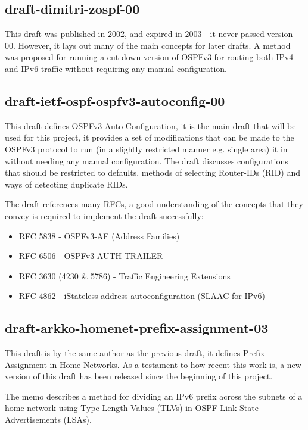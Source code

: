 \documentclass[12pt]{report}
\begin{document}
\subsection{draft-dimitri-zospf-00}
This draft was published in 2002, and expired in 2003 - it never passed version
00.  However, it lays out many of the main concepts for later drafts. A method
was proposed for running a cut down version of OSPFv3 for routing both IPv4 and
IPv6 traffic without requiring any manual configuration. 

\subsection{draft-ietf-ospf-ospfv3-autoconfig-00} 
This draft defines OSPFv3 Auto-Configuration, it is the main draft that will be
used for this project, it provides a set of modifications that can be made to
the OSPFv3 protocol to run (in a slightly restricted manner e.g. single area)
it in without needing any manual configuration. The draft discusses
configurations that should be restricted to defaults, methods of selecting
Router-IDs (RID) and ways of detecting duplicate RIDs. 

The draft references many RFCs, a good understanding of the concepts 
that they convey is required to implement the draft successfully:

\begin{itemize}
	\item RFC 5838 - OSPFv3-AF (Address Families)
	\item RFC 6506 - OSPFv3-AUTH-TRAILER
	\item RFC 3630 (4230 \& 5786) - Traffic Engineering Extensions 
	\item RFC 4862 - iStateless address autoconfiguration (SLAAC for IPv6) 
\end{itemize}

\subsection{draft-arkko-homenet-prefix-assignment-03}
This draft is by the same author as the previous draft, it defines
Prefix Assignment in Home Networks. As a testament to how recent this work is, a
new version of this draft has been released since the beginning of this project. 

The memo describes a method for dividing an IPv6 prefix across the subnets of a
home network using Type Length Values (TLVs) in OSPF Link State Advertisements
(LSAs).
\end{document}

